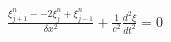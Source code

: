 \documentclass[preview]{standalone}
\begin{document}
\begin{align*}
\frac{\xi_{j+1}^{n} - -2 \xi_{j}^{n} + \xi_{j-1}^{n}}{\delta x^2} + \frac{1}{c^2}\frac{d^2 \xi}{dt^2} = 0
\end{align*}
\end{document}
